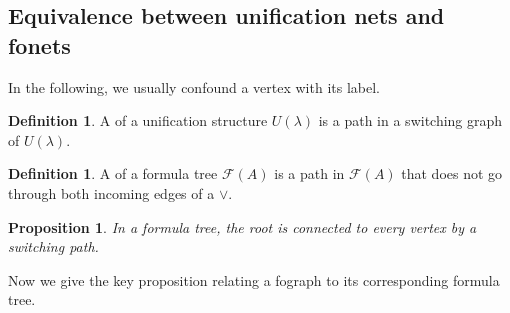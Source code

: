 \documentclass[conference,twosided,10pt]{IEEEtran}
\newtheorem{proposition}[thm]{Proposition}
\theoremstyle{definition}
\newtheorem{definition}[thm]{Definition}
\newcommand{\cor}{\vee}
\newcommand{\formtree}[1]{\mathcal{F}(#1)}
\begin{document}
\subsection{Equivalence between unification nets and fonets}
In the following, we usually confound a vertex with its label. 

\begin{definition} A  of a unification structure $U(\lambda)$ is a path in a switching graph of $U(\lambda)$.
\end{definition}

\begin{definition} A  of a formula tree $\formtree{A}$ is a
	path in $\formtree{A}$ that does not go through both incoming edges of a $\cor$.
\end{definition}

\begin{proposition}
\label{prop1}
In a formula tree, the root is connected to every vertex by a switching path.
\end{proposition}

Now we give the key proposition relating a fograph to its corresponding formula
tree.
\end{document}
